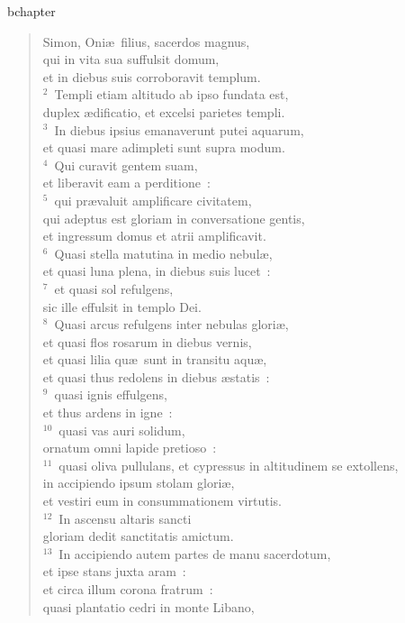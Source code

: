 bchapter\begin{verse}\vspace{-19pt}Simon, Oni\ae\ filius, sacerdos magnus,\\ qui in vita sua suffulsit domum,\\ et in diebus suis corroboravit templum.\\
${}^{2}$~Templi etiam altitudo ab ipso fundata est,\\ duplex \ae dificatio, et excelsi parietes templi.\\
${}^{3}$~In diebus ipsius emanaverunt putei aquarum,\\ et quasi mare adimpleti sunt supra modum.\\
${}^{4}$~Qui curavit gentem suam,\\ et liberavit eam a perditione~:\\
${}^{5}$~qui pr\ae valuit amplificare civitatem,\\ qui adeptus est gloriam in conversatione gentis,\\ et ingressum domus et atrii amplificavit.\\
${}^{6}$~Quasi stella matutina in medio nebul\ae ,\\ et quasi luna plena, in diebus suis lucet~:\\
${}^{7}$~et quasi sol refulgens,\\ sic ille effulsit in templo Dei.\\
${}^{8}$~Quasi arcus refulgens inter nebulas glori\ae ,\\ et quasi flos rosarum in diebus vernis,\\ et quasi lilia qu\ae\ sunt in transitu aqu\ae ,\\ et quasi thus redolens in diebus \ae statis~:\\
${}^{9}$~quasi ignis effulgens,\\ et thus ardens in igne~:\\
${}^{10}$~quasi vas auri solidum,\\ ornatum omni lapide pretioso~:\\
${}^{11}$~quasi oliva pullulans, et cypressus in altitudinem se extollens,\\ in accipiendo ipsum stolam glori\ae ,\\ et vestiri eum in consummationem virtutis.\\
${}^{12}$~In ascensu altaris sancti\\ gloriam dedit sanctitatis amictum.\\
${}^{13}$~In accipiendo autem partes de manu sacerdotum,\\ et ipse stans juxta aram~:\\ et circa illum corona fratrum~:\\ quasi plantatio cedri in monte Libano,\\

\end{verse}
